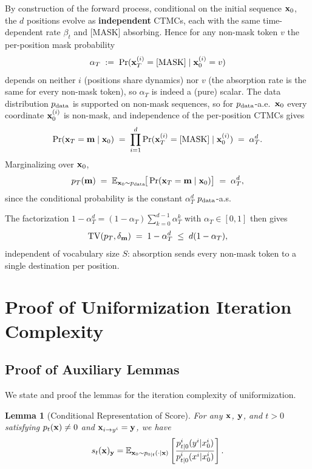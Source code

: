 \documentclass{article} %
\newtheorem{lemma}[theorem]{Lemma}
\newcommand{\E}{\mathbb{E}}
\newcommand{\bfx}{{\bf x}}
\newcommand{\bfy}{ {\bf y}}
\newcommand{\bfm}{{\bf m}}
\newcommand{\TV}{\mathrm{TV}}
\newcommand{\mask}{\text{[MASK]}}
\begin{document}
By construction of the forward process, conditional on the initial
sequence $\bfx_0$, the $d$ positions evolve as \textbf{independent} CTMCs, each
with the same time-dependent rate $\beta_t$ and $\mask$ absorbing.
Hence for any non-mask token $v$ the per-position mask probability
\[
  \alpha_T \;:=\; \Pr(\bfx_T^{(i)} = \mask \mid \bfx_0^{(i)} = v)
\]
depends on neither $i$ (positions share dynamics) nor $v$ (the
absorption rate is the same for every non-mask token), so $\alpha_T$
is indeed a (pure) scalar. The data distribution $p_{\rm data}$ is
supported on non-mask sequences, so for $p_{\rm data}$-a.e.\ $\bfx_0$
every coordinate $\bfx_0^{(i)}$ is non-mask, and independence of the
per-position CTMCs gives
\[
  \Pr(\bfx_T = \bfm \mid \bfx_0)
  \;=\; \prod_{i=1}^d \Pr(\bfx_T^{(i)} = \mask \mid \bfx_0^{(i)})
  \;=\; \alpha_T^d.
\]
Marginalizing over $\bfx_0$,
\[
  p_T(\bfm) \;=\; \E_{\bfx_0 \sim p_{\rm data}}\!\big[\Pr(\bfx_T = \bfm \mid \bfx_0)\big]
  \;=\; \alpha_T^d,
\]
since the conditional probability is the constant $\alpha_T^d$
$p_{\rm data}$-a.s.

 
 
 The factorization
$1 - \alpha_T^d = (1-\alpha_T)\sum_{k=0}^{d-1}\alpha_T^k$ with
$\alpha_T \in [0,1]$ then gives
\[
  \TV(p_T, \delta_\bfm) \;=\; 1 - \alpha_T^d \;\le\; d(1-\alpha_T),
\]
independent of vocabulary size $S$: absorption sends every non-mask
token to a single destination per position.

\section{Proof of Uniformization Iteration Complexity}
\label{sec:appendix_step_complexity}

\subsection{Proof of Auxiliary Lemmas}
We state and proof the lemmas for the iteration complexity of uniformization.

\begin{lemma}[Conditional Representation of Score]\label{lemma:score_conditional}
    For any $\bfx$, $\bfy$, and $t>0$ satisfying $p_t(\bfx)\neq 0$ and $\bfx_{i \to y^i}=\bfy$, we have
    \begin{equation}
        s_t(\bfx)_\bfy = \mathbb{E}_{\bfx_0 \sim p_{0|t}(\cdot | \bfx)} \left[ \frac{p^i_{t|0}(y^i|x_0^i)}{p^i_{t|0}(x^i|x^i_0)} \right].
    \end{equation}
\end{lemma}
\end{document}

